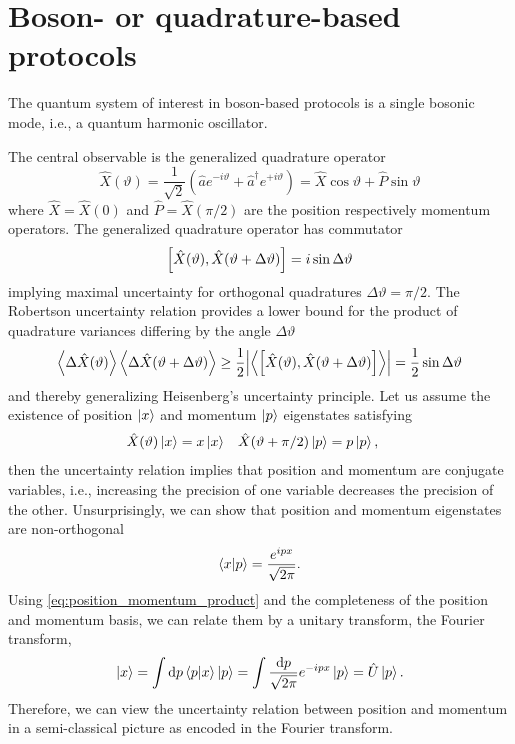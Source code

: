 \section{Boson- or quadrature-based protocols}

The quantum system of interest in boson-based protocols is a single bosonic mode, i.e., a quantum harmonic oscillator.

The central observable is the generalized quadrature operator~\cite[p.~36]{Barnett2002}
\begin{equation}
	\hat{X}(\vartheta)
	=
	\frac{1}{\sqrt{2}}
	\left(
		\hat{a}
		e^{-i\vartheta}
		+
		\hat{a}^\dagger
		e^{+i\vartheta}
	\right)
	=
	\hat{X}
	\cos\vartheta
	+
	\hat{P}
	\sin\vartheta
\end{equation}
where $\hat{X}=\hat{X}(0)$ and $\hat{P}=\hat{X}(\pi/2)$ are the position respectively momentum operators.
The generalized quadrature operator has commutator
\begin{equation}
	\comm{\hat{X}(\vartheta)}{\hat{X}(\vartheta+\Delta\vartheta)}
	=
	i\sin\Delta\vartheta
\end{equation}
implying maximal uncertainty for orthogonal quadratures $\Delta\vartheta=\pi/2$.
The Robertson uncertainty relation provides a lower bound for the product of quadrature variances differing by the angle $\Delta\vartheta$
\begin{equation}
	\expval{\Delta\hat{X}(\vartheta)}
	\expval{\Delta\hat{X}(\vartheta+\Delta\vartheta)}
	\geq
	\frac{1}{2}
	\abs{\expval{\comm{\hat{X}(\vartheta)}{\hat{X}(\vartheta+\Delta\vartheta)}}}
	=
	\frac{1}{2}
	\sin\Delta\vartheta
\end{equation}
and thereby generalizing Heisenberg's uncertainty principle.
Let us assume the existence of position $\ket{x}$ and momentum $\ket{p}$ eigenstates satisfying
\begin{align}
	\hat{X}(\vartheta)
	\ket{x}
	&=
	x
	\ket{x}
	&
	\hat{X}(\vartheta+\pi/2)
	\ket{p}
	&=
	p
	\ket{p}
	,
\end{align}
then the uncertainty relation implies that position and momentum are conjugate variables, i.e., increasing the precision of one variable decreases the precision of the other.
Unsurprisingly, we can show that position and momentum eigenstates are non-orthogonal~\cite[p.~29]{Mukhanov2007}
\begin{equation}
	\braket{x}{p}
	=
	\frac{e^{ipx}}{\sqrt{2\pi}}
	\label{eq:position_momentum_product}
	.
\end{equation}
Using \cref{eq:position_momentum_product} and the completeness of the position and momentum basis, we can relate them by a unitary transform, the Fourier transform,
\begin{equation}
	\ket{x}
	=
	\int\dd{p}
	\braket{p}{x}
	\ket{p}
	=
	\int\frac{\dd{p}}{\sqrt{2\pi}}
	e^{-ipx}
	\ket{p}
	=
	\hat{U}
	\ket{p}
	.
\end{equation}
Therefore, we can view the uncertainty relation between position and momentum in a semi-classical picture as encoded in the Fourier transform.

